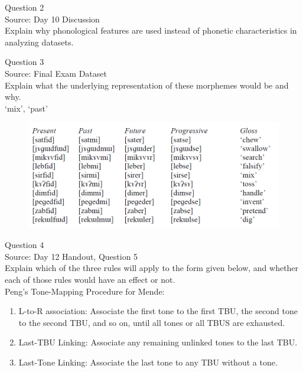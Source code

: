 \documentclass[12pt]{article}
\begin{document}
\newpage

{\large Question 2}\\

Source: Day 10 Discussion\\

Explain why phonological features are used instead of phonetic characteristics in analyzing datasets.\\


\newpage

{\large Question 3}\\

Source: Final Exam Dataset\\

Explain what the underlying representation of these morphemes would be and why.\\

`mix', `past'

\begin{figure}[H]
\includegraphics{../images/final_dataset.png}
\end{figure}

\newpage

{\large Question 4}\\

Source: Day 12 Handout, Question 5\\

Explain which of the three rules will apply to the form given below, and whether each of those rules would have an effect or not.\\

Peng’s Tone-Mapping Procedure for Mende: \begin{enumerate} \item L-to-R association: Associate the first tone to the first TBU, the second tone to the second TBU, and so on, until all tones or all TBUS are exhausted. \item Last-TBU Linking: Associate any remaining unlinked tones to the last TBU. \item Last-Tone Linking: Associate the last tone to any TBU without a tone. \end{enumerate}
\end{document}
